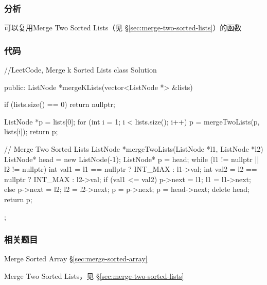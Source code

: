 \subsubsection{分析}
可以复用Merge Two Sorted Lists（见 \S \ref{sec:merge-two-sorted-lists}）的函数


\subsubsection{代码}
\begin{Code}
//LeetCode, Merge k Sorted Lists
class Solution {
public:
    ListNode *mergeKLists(vector<ListNode *> &lists) {
        if (lists.size() == 0) return nullptr;

        ListNode *p = lists[0];
        for (int i = 1; i < lists.size(); i++) {
            p = mergeTwoLists(p, lists[i]);
        }
        return p;
    }
 
    // Merge Two Sorted Lists
    ListNode *mergeTwoLists(ListNode *l1, ListNode *l2) {
        ListNode* head = new ListNode(-1);
        ListNode* p = head;
        while (l1 != nullptr || l2 != nullptr) {
            int val1 = l1 == nullptr ? INT_MAX : l1->val;
            int val2 = l2 == nullptr ? INT_MAX : l2->val;
            if (val1 <= val2) {
                p->next = l1;
                l1 = l1->next;
            } else {
                p->next = l2;
                l2 = l2->next;
            }
            p = p->next;
        }
        p = head->next;
        delete head;
        return p;
    }
};
\end{Code}


\subsubsection{相关题目}
\begindot
\item Merge Sorted Array \S \ref{sec:merge-sorted-array}
\item Merge Two Sorted Lists，见 \S \ref{sec:merge-two-sorted-lists}
\myenddot